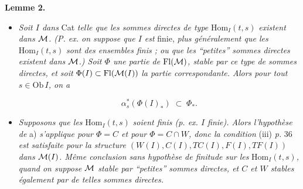 \textbf{Lemme 2.}

\begin{itemize}[leftmargin=3em]
\item[a)] \textit{Soit $I$ dans} Cat \textit{telle que les sommes directes de type} $\mathrm{Hom}_I(t,s)$ \textit{existent dans $\mathcal{M}$. (P. ex. on suppose que $I$ est} finie, \textit{plus généralement que les} $\mathrm{Hom}_I(t,s)$ \textit{sont des ensembles finis ; ou que les “petites” sommes directes existent dans $\mathcal{M}$.) Soit $\Phi$ une partie de} $\mathrm{Fl}(\mathcal{M})$\textit{, stable par ce type de sommes directes, et soit} $\Phi(I)\subset\mathrm{Fl}(\mathcal{M}(I))$ \textit{la partie correspondante. Alors pour tout $s\in\mathrm{Ob}\,I$, on a}

\[
\alpha_s^*(\Phi(I)_*) \;\subset\; \Phi_*.
\]
\item[b)] \textit{Supposons que les} $\mathrm{Hom}_I(t,s)$ \textit{soient finis (p. ex. $I$ finie). Alors l'hypothèse de} a) \textit{s'applique pour $\Phi=C$ et pour $\Phi=C{\cap}W$, donc la condition} (iii) \textit{p.} 36 \textit{est satisfaite pour la structure $(W(I),C(I),TC(I),F(I),TF(I))$ dans $\mathcal{M}(I)$. Même conclusion sans hypothèse de finitude sur les} $\mathrm{Hom}_I(t,s)$\textit{, quand on suppose $\mathcal{M}$ stable par “petites” sommes directes, et $C$ et $W$ stables également par de telles sommes directes.}
\end{itemize}

